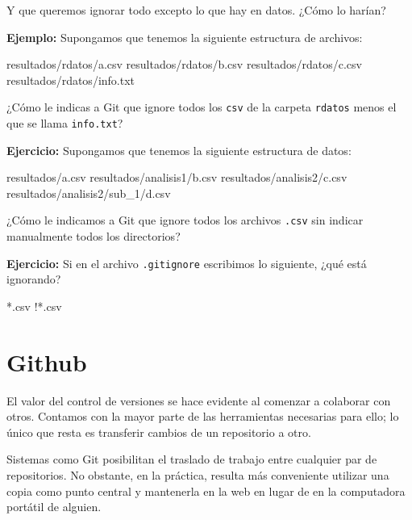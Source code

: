 \documentclass[
]{book}
\newenvironment{Shaded}{\begin{snugshade}}{\end{snugshade}}
\newcommand{\ExtensionTok}[1]{#1}
\begin{document}
Y que queremos ignorar todo excepto lo que hay en datos. ¿Cómo lo harían?

\textbf{Ejemplo:} Supongamos que tenemos la siguiente estructura de archivos:

\begin{Shaded}
\begin{Highlighting}[]
\ExtensionTok{resultados/rdatos/a.csv}
\ExtensionTok{resultados/rdatos/b.csv}
\ExtensionTok{resultados/rdatos/c.csv}
\ExtensionTok{resultados/rdatos/info.txt}
\end{Highlighting}
\end{Shaded}

¿Cómo le indicas a Git que ignore todos los \texttt{csv} de la carpeta \texttt{rdatos} menos el que se llama \texttt{info.txt}?

\textbf{Ejercicio:} Supongamos que tenemos la siguiente estructura de datos:

\begin{Shaded}
\begin{Highlighting}[]
\ExtensionTok{resultados/a.csv}
\ExtensionTok{resultados/analisis1/b.csv}
\ExtensionTok{resultados/analisis2/c.csv}
\ExtensionTok{resultados/analisis2/sub\_1/d.csv}
\end{Highlighting}
\end{Shaded}

¿Cómo le indicamos a Git que ignore todos los archivos \texttt{.csv} sin indicar manualmente todos los directorios?

\textbf{Ejercicio:} Si en el archivo \texttt{.gitignore} escribimos lo siguiente, ¿qué está ignorando?

\begin{Shaded}
\begin{Highlighting}[]
\ExtensionTok{*.csv}
\ExtensionTok{!*.csv}
\end{Highlighting}
\end{Shaded}

\hypertarget{github}{%
\section{Github}\label{github}}

El valor del control de versiones se hace evidente al comenzar a colaborar con otros. Contamos con la mayor parte de las herramientas necesarias para ello; lo único que resta es transferir cambios de un repositorio a otro.

Sistemas como Git posibilitan el traslado de trabajo entre cualquier par de repositorios. No obstante, en la práctica, resulta más conveniente utilizar una copia como punto central y mantenerla en la web en lugar de en la computadora portátil de alguien.
\end{document}
